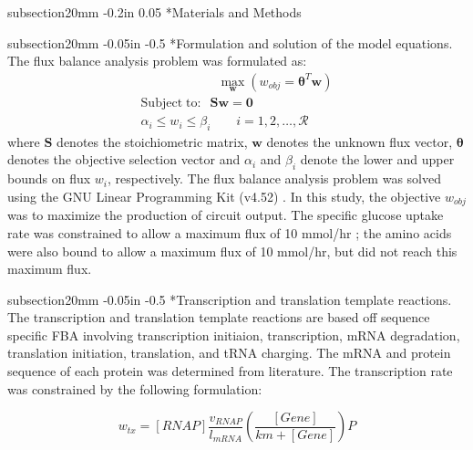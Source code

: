 \documentclass[12pt]{article}
\makeatletter
\renewcommand\subsection{\@startsection
	{subsection}{2}{0mm}
	{-0.05in}
	{-0.5\baselineskip}
	{\normalfont\normalsize\bfseries}}
\renewcommand\section{\@startsection
	{subsection}{2}{0mm}
	{-0.2in}
	{0.05\baselineskip}
	{\normalfont\large\bfseries}}
\makeatother
\begin{document}
\section*{Materials and Methods}

\subsection*{Formulation and solution of the model equations.}
The flux balance analysis problem was formulated as:
\begin{equation}\nonumber
 \begin{multlined}
	\qquad \qquad \qquad \max_{\boldsymbol{w}}{} \! \left( w_{obj} = \mathbf{\boldsymbol{\theta}}^T \boldsymbol{w} \right) \\
	\mathrm{Subject \; to:}
	 \; \; \mathbf{S}\mathbf{w}=\mathbf{0} \\
\alpha_i \leq w_i \leq \beta_i  \qquad i=1,2,\hdots,\mathcal{R}
 \end{multlined}
\end{equation}
where $\mathbf{S}$ denotes the stoichiometric matrix, $\mathbf{w}$ denotes the unknown flux vector, $\boldsymbol{\theta}$ denotes the objective selection vector
and $\alpha_i$ and $\beta_i$ denote the lower and upper bounds on flux $w_{i}$, respectively.
The flux balance analysis problem was solved using the GNU Linear Programming Kit (v4.52) \cite{GLPK}.
In this study, the objective $w_{obj}$ was to maximize the production of circuit output.
The specific glucose uptake rate was constrained to allow a maximum flux of 10 mmol/hr \cite{2002_Mahadevan_BiophysJ}; the amino acids were also bound to allow a maximum flux of 10 mmol/hr, but did not reach this maximum flux.

\subsection*{Transcription and translation template reactions.}
The transcription and translation template reactions are based off sequence specific FBA \cite{2002_allen_palsson} involving transcription initiaion, transcription, mRNA degradation, translation initiation, translation, and tRNA charging. 
The mRNA and protein sequence of each protein was determined from literature. 
The transcription rate was constrained by the following formulation:

\begin{equation}\nonumber
	w_{tx} = [RNAP]\frac{v_{RNAP}}{l_{mRNA}}\left(\frac{[Gene]}{km+[Gene]}\right)P
\end{equation}
\end{document}
